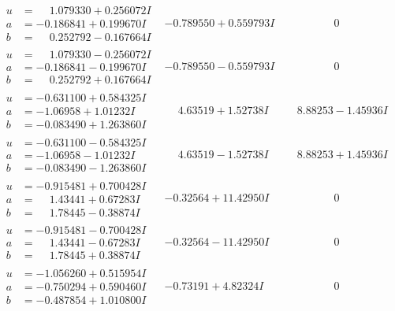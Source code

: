 \documentclass[1p]{elsarticle_modified}
\theoremstyle{definition}
\begin{document}
$$\begin{array}{c|c|c}
\begin{aligned}
u &= \phantom{-}1.079330 + 0.256072 I \\
a &= -0.186841 + 0.199670 I \\
b &= \phantom{-}0.252792 - 0.167664 I\end{aligned}
 & -0.789550 + 0.559793 I & \phantom{-0.000000 } 0 \\ \hline\begin{aligned}
u &= \phantom{-}1.079330 - 0.256072 I \\
a &= -0.186841 - 0.199670 I \\
b &= \phantom{-}0.252792 + 0.167664 I\end{aligned}
 & -0.789550 - 0.559793 I & \phantom{-0.000000 } 0 \\ \hline\begin{aligned}
u &= -0.631100 + 0.584325 I \\
a &= -1.06958 + 1.01232 I \\
b &= -0.083490 + 1.263860 I\end{aligned}
 & \phantom{-}4.63519 + 1.52738 I & \phantom{-}8.88253 - 1.45936 I \\ \hline\begin{aligned}
u &= -0.631100 - 0.584325 I \\
a &= -1.06958 - 1.01232 I \\
b &= -0.083490 - 1.263860 I\end{aligned}
 & \phantom{-}4.63519 - 1.52738 I & \phantom{-}8.88253 + 1.45936 I \\ \hline\begin{aligned}
u &= -0.915481 + 0.700428 I \\
a &= \phantom{-}1.43441 + 0.67283 I \\
b &= \phantom{-}1.78445 - 0.38874 I\end{aligned}
 & -0.32564 + 11.42950 I & \phantom{-0.000000 } 0 \\ \hline\begin{aligned}
u &= -0.915481 - 0.700428 I \\
a &= \phantom{-}1.43441 - 0.67283 I \\
b &= \phantom{-}1.78445 + 0.38874 I\end{aligned}
 & -0.32564 - 11.42950 I & \phantom{-0.000000 } 0 \\ \hline\begin{aligned}
u &= -1.056260 + 0.515954 I \\
a &= -0.750294 + 0.590460 I \\
b &= -0.487854 + 1.010800 I\end{aligned}
 & -0.73191 + 4.82324 I & \phantom{-0.000000 } 0 \\ \hline\begin{aligned}

\end{aligned}
\end{array}$$
\end{document}
